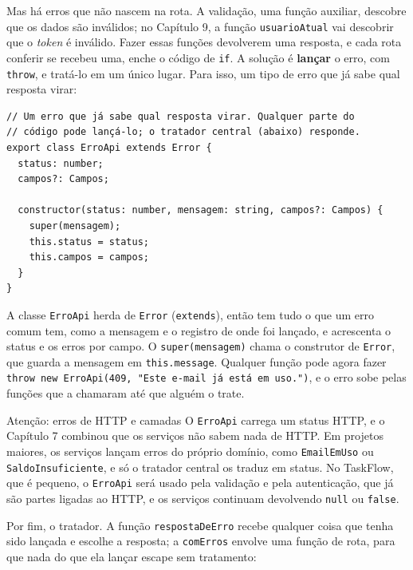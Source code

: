 Mas há erros que não nascem na rota. A validação, uma função auxiliar, descobre que os dados são inválidos; no Capítulo 9, a função \texttt{usuarioAtual} vai descobrir que o \textit{token} é inválido. Fazer essas funções devolverem uma resposta, e cada rota conferir se recebeu uma, enche o código de \texttt{if}. A solução é \textbf{lançar} o erro, com \texttt{throw}, e tratá-lo em um único lugar. Para isso, um tipo de erro que já sabe qual resposta virar:

\begin{codigo}
\begin{Verbatim}[breaklines=true, breaksymbolleft={}, fontsize=\footnotesize]
// Um erro que já sabe qual resposta virar. Qualquer parte do
// código pode lançá-lo; o tratador central (abaixo) responde.
export class ErroApi extends Error {
  status: number;
  campos?: Campos;

  constructor(status: number, mensagem: string, campos?: Campos) {
    super(mensagem);
    this.status = status;
    this.campos = campos;
  }
}
\end{Verbatim}
\end{codigo}

A classe \texttt{ErroApi} herda de \texttt{Error} (\texttt{extends}), então tem tudo o que um erro comum tem, como a mensagem e o registro de onde foi lançado, e acrescenta o status e os erros por campo. O \texttt{super(mensagem)} chama o construtor de \texttt{Error}, que guarda a mensagem em \texttt{this.message}. Qualquer função pode agora fazer \texttt{throw new ErroApi(409, "Este e-mail já está em uso.")}, e o erro sobe pelas funções que a chamaram até que alguém o trate.

\begin{destaque}{Atenção: erros de HTTP e camadas}
O \texttt{ErroApi} carrega um status HTTP, e o Capítulo 7 combinou que os serviços não sabem nada de HTTP. Em projetos maiores, os serviços lançam erros do próprio domínio, como \texttt{EmailEmUso} ou \texttt{SaldoInsuficiente}, e só o tratador central os traduz em status. No TaskFlow, que é pequeno, o \texttt{ErroApi} será usado pela validação e pela autenticação, que já são partes ligadas ao HTTP, e os serviços continuam devolvendo \texttt{null} ou \texttt{false}.
\end{destaque}

Por fim, o tratador. A função \texttt{respostaDeErro} recebe qualquer coisa que tenha sido lançada e escolhe a resposta; a \texttt{comErros} envolve uma função de rota, para que nada do que ela lançar escape sem tratamento:

